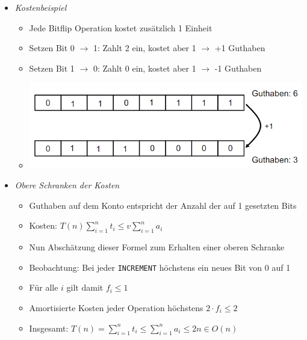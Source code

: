 \documentclass[
    12pt,
    a4paper,
    ngerman,
    color=3b,%
    marginpar=false,
    colorback=false,
    leqno,
]{tudaexercise}
\begin{document}
\begin{itemize}
\begin{itemize}
                \item \textit{Kostenbeispiel}
                    \begin{itemize}
                        \item Jede Bitflip Operation kostet zusätzlich 1 Einheit
                        \item Setzen Bit 0 $\rightarrow$ 1: Zahlt 2 ein, kostet aber 1 $\rightarrow$ +1 Guthaben
                        \item Setzen Bit 1 $\rightarrow$ 0: Zahlt 0 ein, kostet aber 1 $\rightarrow$ -1 Guthaben
                        \item[] \includegraphics[width=12cm]{pictures/guthaben.PNG}
                    \end{itemize}
                
                \item \textit{Obere Schranken der Kosten}
                    \begin{itemize}
                        \item Guthaben auf dem Konto entspricht der Anzahl der auf 1 gesetzten Bits
                        \item Kosten: $T(n) \sum^n_{i=1} t_i \leq v\sum^n_{i=1} a_i$
                        \item Nun Abschätzung dieser Formel zum Erhalten einer oberen Schranke
                        \item Beobachtung: Bei jeder \texttt{INCREMENT} höchstens ein neues Bit von 0 auf 1
                        \item Für alle $i$ gilt damit $f_i \leq 1$
                        \item Amortisierte Kosten jeder Operation höchstens $2 \cdot f_i \leq 2$
                        \item Insgesamt: $T(n) = \sum^n_{i=1} t_i \leq \sum^n_{i=1} a_i \leq 2n \in O(n)$
                    \end{itemize}
            \end{itemize}

\pagebreak


\end{itemize}
\end{document}
